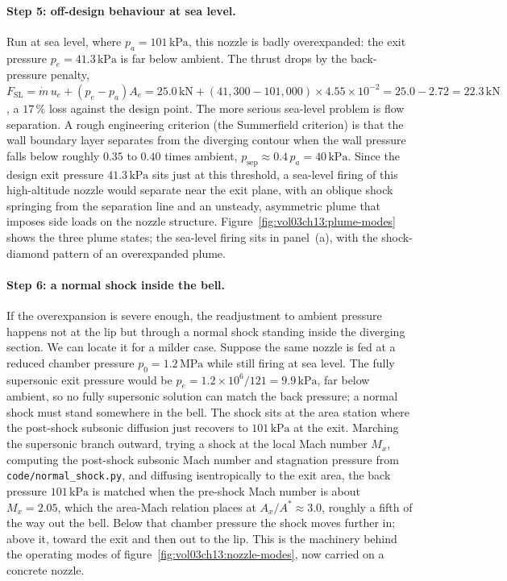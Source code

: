 \paragraph{Step 5: off-design behaviour at sea level.} Run at sea
level, where $p_a = 101\,\text{kPa}$, this nozzle is badly
overexpanded: the exit pressure $p_e = 41.3\,\text{kPa}$ is far below
ambient. The thrust drops by the back-pressure penalty,
$F_{\text{SL}} = \dot m\,u_e + (p_e - p_a)A_e = 25.0\,\text{kN} +
(41{,}300 - 101{,}000)\times 4.55\times 10^{-2} = 25.0 - 2.72 =
22.3\,\text{kN}$, a $17\,\%$ loss against the design point. The more
serious sea-level problem is flow separation. A rough engineering
criterion (the Summerfield criterion) is that the wall boundary layer
separates from the diverging contour when the wall pressure falls below
roughly $0.35$ to $0.40$ times ambient,
$p_{\text{sep}} \approx 0.4\,p_a = 40\,\text{kPa}$. Since the design
exit pressure $41.3\,\text{kPa}$ sits just at this threshold, a
sea-level firing of this high-altitude nozzle would separate near the
exit plane, with an oblique shock springing from the separation line
and an unsteady, asymmetric plume that imposes side loads on the nozzle
structure. Figure~\ref{fig:vol03ch13:plume-modes} shows the three plume
states; the sea-level firing sits in panel~(a), with the shock-diamond
pattern of an overexpanded plume.



\paragraph{Step 6: a normal shock inside the bell.} If the
overexpansion is severe enough, the readjustment to ambient pressure
happens not at the lip but through a normal shock standing inside the
diverging section. We can locate it for a milder case. Suppose the same
nozzle is fed at a reduced chamber pressure
$p_0 = 1.2\,\text{MPa}$ while still firing at sea level. The fully
supersonic exit pressure would be
$p_e = 1.2\times 10^{6}/121 = 9.9\,\text{kPa}$, far below ambient, so
no fully supersonic solution can match the back pressure; a normal
shock must stand somewhere in the bell. The shock sits at the area
station where the post-shock subsonic diffusion just recovers to
$101\,\text{kPa}$ at the exit. Marching the supersonic branch outward,
trying a shock at the local Mach number $M_x$, computing the
post-shock subsonic Mach number and stagnation pressure from
\texttt{code/normal\_shock.py}, and diffusing isentropically to the
exit area, the back pressure $101\,\text{kPa}$ is matched when the
pre-shock Mach number is about $M_x = 2.05$, which the area-Mach
relation places at $A_x/A^* \approx 3.0$, roughly a fifth of the way
out the bell. Below that chamber pressure the shock moves further in;
above it, toward the exit and then out to the lip. This is the
machinery behind the operating modes of
figure~\ref{fig:vol03ch13:nozzle-modes}, now carried on a concrete
nozzle.


